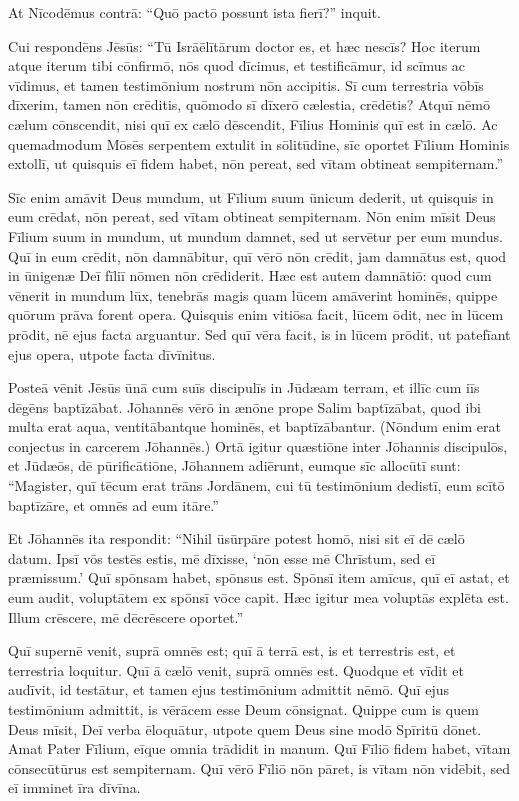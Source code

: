 \Versus At Nīcodēmus contrā: ``Quō pactō possunt ista fierī?'' inquit.

\Versus Cui respondēns Jēsūs: ``Tū Isrāēlītārum doctor es, et hæc nescīs?
\Versus Hoc iterum atque iterum tibi cōnfirmō, nōs quod dīcimus, et testificāmur, id scīmus ac vīdimus, et tamen testimōnium nostrum nōn accipitis.
\Versus Sī cum terrestria vōbīs dīxerim, tamen nōn crēditis, quōmodo sī dīxerō cælestia, crēdētis?
\Versus Atquī nēmō cælum cōnscendit, nisi quī ex cælō dēscendit, Fīlius Hominis quī est in cælō.
\Versus Ac quemadmodum Mōsēs serpentem extulit in sōlitūdine, sīc oportet Fīlium Hominis extollī,
\Versus ut quisquis eī fidem habet, nōn pereat, sed vītam obtineat sempiternam.''

\Versus Sīc enim amāvit Deus mundum, ut Fīlium suum ūnicum dederit, ut quisquis in eum crēdat, nōn pereat, sed vītam obtineat sempiternam.
\Versus Nōn enim mīsit Deus Fīlium suum in mundum, ut mundum damnet, sed ut servētur per eum mundus.
\Versus Quī in eum crēdit, nōn damnābitur, quī vērō nōn crēdit, jam damnātus est, quod in ūnigenæ Deī fīliī nōmen nōn crēdiderit.
\Versus Hæc est autem damnātiō: quod cum vēnerit in mundum lūx, tenebrās magis quam lūcem amāverint hominēs, quippe quōrum prāva forent opera.
\Versus Quisquis enim vitiōsa facit, lūcem ōdit, nec in lūcem prōdit, nē ejus facta arguantur.
\Versus Sed quī vēra facit, is in lūcem prōdit, ut patefīant ejus opera, utpote facta dīvīnitus.

\Versus Posteā vēnit Jēsūs ūnā cum suīs discipulīs in Jūdæam terram, et illīc cum iīs dēgēns baptīzābat.
\Versus Jōhannēs vērō in ænōne prope Salim baptīzābat, quod ibi multa erat aqua, ventitābantque hominēs, et baptīzābantur.
\Versus (Nōndum enim erat conjectus in carcerem Jōhannēs.)
\Versus Ortā igitur quæstiōne inter Jōhannis discipulōs, et Jūdæōs, dē pūrificātiōne,
\Versus Jōhannem adiērunt, eumque sīc allocūtī sunt: ``Magister, quī tēcum erat trāns Jordānem, cui tū testimōnium dedistī, eum scītō baptīzāre, et omnēs ad eum itāre.''

\Versus Et Jōhannēs ita respondit: ``Nihil ūsūrpāre potest homō, nisi sit eī dē cælō datum.
\Versus Ipsī vōs testēs estis, mē dīxisse, `nōn esse mē Chrīstum, sed eī præmissum.'
\Versus Quī spōnsam habet, spōnsus est. Spōnsī item amīcus, quī eī astat, et eum audit, voluptātem ex spōnsī vōce capit. Hæc igitur mea voluptās explēta est.
\Versus Illum crēscere, mē dēcrēscere oportet.''

\Versus Quī supernē venit, suprā omnēs est; quī ā terrā est, is et terrestris est, et terrestria loquitur. Quī ā cælō venit, suprā omnēs est.
\Versus Quodque et vīdit et audīvit, id testātur, et tamen ejus testimōnium admittit nēmō.
\Versus Quī ejus testimōnium admittit, is vērācem esse Deum cōnsignat.
\Versus Quippe cum is quem Deus mīsit, Deī verba ēloquātur, utpote quem Deus sine modō Spīritū dōnet.
\Versus Amat Pater Fīlium, eīque omnia trādidit in manum.
\Versus Quī Fīliō fidem habet, vītam cōnsecūtūrus est sempiternam. Quī vērō Fīliō nōn pāret, is vītam nōn vidēbit, sed eī imminet īra dīvīna.

